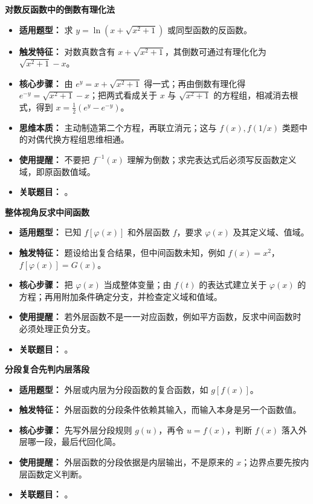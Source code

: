 \begin{knowledgeBox}
\textbf{对数反函数中的倒数有理化法}

\begin{itemize}
  \item \textbf{适用题型：} 求 \(y=\ln\left(x+\sqrt{x^2+1}\right)\) 或同型函数的反函数。
  \item \textbf{触发特征：} 对数真数含有 \(x+\sqrt{x^2+1}\)，其倒数可通过有理化化为 \(\sqrt{x^2+1}-x\)。
  \item \textbf{核心步骤：} 由 \(e^y=x+\sqrt{x^2+1}\) 得一式；再由倒数有理化得 \(e^{-y}=\sqrt{x^2+1}-x\)；把两式看成关于 \(x\) 与 \(\sqrt{x^2+1}\) 的方程组，相减消去根式，得到 \(x=\frac12(e^y-e^{-y})\)。
  \item \textbf{思维本质：} 主动制造第二个方程，再联立消元；这与 \(f(x),f(1/x)\) 类题中的对偶代换方程组思维相通。
  \item \textbf{使用提醒：} 不要把 \(f^{-1}(x)\) 理解为倒数；求完表达式后必须写反函数定义域，即原函数值域。
  \item \textbf{关联题目：} 。
\end{itemize}

\textbf{整体视角反求中间函数}

\begin{itemize}
  \item \textbf{适用题型：} 已知 \(f[\varphi(x)]\) 和外层函数 \(f\)，要求 \(\varphi(x)\) 及其定义域、值域。
  \item \textbf{触发特征：} 题设给出复合结果，但中间函数未知，例如 \(f(x)=x^2\)，\(f[\varphi(x)]=G(x)\)。
  \item \textbf{核心步骤：} 把 \(\varphi(x)\) 当成整体变量；由 \(f(t)\) 的表达式建立关于 \(\varphi(x)\) 的方程；再用附加条件确定分支，并检查定义域和值域。
  \item \textbf{使用提醒：} 若外层函数不是一一对应函数，例如平方函数，反求中间函数时必须处理正负分支。
  \item \textbf{关联题目：} 。
\end{itemize}

\textbf{分段复合先判内层落段}

\begin{itemize}
  \item \textbf{适用题型：} 外层或内层为分段函数的复合函数，如 \(g[f(x)]\)。
  \item \textbf{触发特征：} 外层函数的分段条件依赖其输入，而输入本身是另一个函数值。
  \item \textbf{核心步骤：} 先写外层分段规则 \(g(u)\)，再令 \(u=f(x)\)，判断 \(f(x)\) 落入外层哪一段，最后代回化简。
  \item \textbf{使用提醒：} 外层函数的分段依据是内层输出，不是原来的 \(x\)；边界点要先按内层函数定义判断。
  \item \textbf{关联题目：} 。
\end{itemize}


\end{knowledgeBox}
